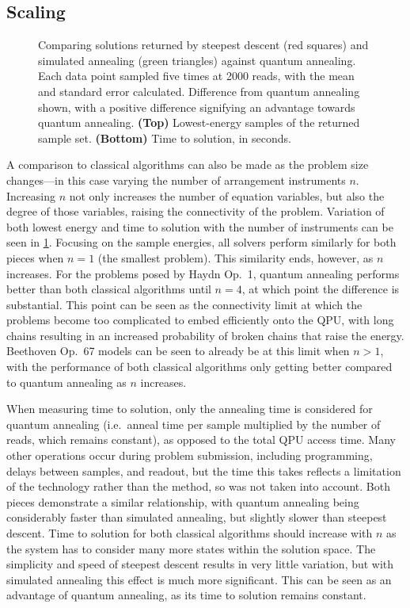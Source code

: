 \documentclass[twocolumn]{article}
\theoremstyle{definition}
\begin{document}
\subsection{Scaling}

\begin{figure}[!b]
    \centering\footnotesize
    
    \caption{Comparing solutions returned by steepest descent (red squares) and simulated annealing (green triangles) against quantum annealing. Each data point sampled five times at \num{2000} reads, with the mean and standard error calculated. Difference from quantum annealing shown, with a positive difference signifying an advantage towards quantum annealing. \textbf{(Top)} Lowest-energy samples of the returned sample set. \textbf{(Bottom)} Time to solution, in seconds.}
    \label{fig:scaling}
\end{figure}

A comparison to classical algorithms can also be made as the problem size changes---in this case varying the number of arrangement instruments $n$. Increasing $n$ not only increases the number of equation variables, but also the degree of those variables, raising the connectivity of the problem. Variation of both lowest energy and time to solution with the number of instruments can be seen in \cref{fig:scaling}. Focusing on the sample energies, all solvers perform similarly for both pieces when $n=1$ (the smallest problem). This similarity ends, however, as $n$ increases. For the problems posed by Haydn Op.\ 1, quantum annealing performs better than both classical algorithms until $n=4$, at which point the difference is substantial. This point can be seen as the connectivity limit at which the problems become too complicated to embed efficiently onto the QPU, with long chains resulting in an increased probability of broken chains that raise the energy. Beethoven Op.\ 67 models can be seen to already be at this limit when $n>1$, with the performance of both classical algorithms only getting better compared to quantum annealing as $n$ increases.

When measuring time to solution, only the annealing time is considered for quantum annealing (i.e.\ anneal time per sample multiplied by the number of reads, which remains constant), as opposed to the total QPU access time. Many other operations occur during problem submission, including programming, delays between samples, and readout, but the time this takes reflects a limitation of the technology rather than the method, so was not taken into account. Both pieces demonstrate a similar relationship, with quantum annealing being considerably faster than simulated annealing, but slightly slower than steepest descent. Time to solution for both classical algorithms should increase with $n$ as the system has to consider many more states within the solution space. The simplicity and speed of steepest descent results in very little variation, but with simulated annealing this effect is much more significant. This can be seen as an advantage of quantum annealing, as its time to solution remains constant.
\end{document}
